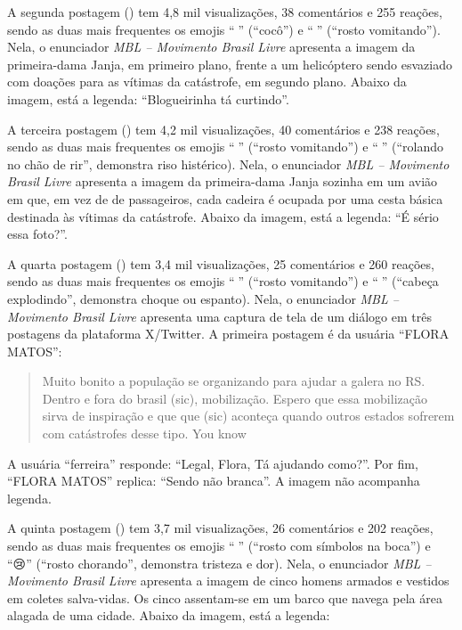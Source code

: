 \documentclass[portuguese]{textolivre}
\begin{document}
A segunda postagem () tem 4,8 mil visualizações, 38 comentários e 255 reações, sendo as duas mais frequentes os emojis ``{\Symbola 💩}'' (``cocô'') e ``{\Symbola 🤮}'' (``rosto vomitando''). Nela, o enunciador \emph{MBL -- Movimento Brasil Livre} apresenta a imagem da primeira-dama Janja, em primeiro plano, frente a um helicóptero sendo esvaziado com doações para as vítimas da catástrofe, em segundo plano. Abaixo da imagem, está a legenda: ``Blogueirinha tá curtindo''.

A terceira postagem () tem 4,2 mil visualizações, 40 comentários e 238 reações, sendo as duas mais frequentes os emojis ``{\Symbola 🤮}'' (``rosto vomitando'') e ``{\Symbola 🤣}'' (``rolando no chão de rir'', demonstra riso histérico). Nela, o enunciador \emph{MBL -- Movimento Brasil Livre} apresenta a imagem da primeira-dama Janja sozinha em um avião em que, em vez de de passageiros, cada cadeira é ocupada por uma cesta básica destinada às vítimas da catástrofe. Abaixo da imagem, está a legenda: ``É sério essa foto?''.

A quarta postagem () tem 3,4 mil visualizações, 25 comentários e 260 reações, sendo as duas mais frequentes os emojis ``{\Symbola 🤮}'' (``rosto vomitando'') e ``{\Symbola 🤯}'' (``cabeça explodindo'', demonstra choque ou espanto). Nela, o enunciador \emph{MBL -- Movimento Brasil Livre} apresenta uma captura de tela de um diálogo em três postagens da plataforma X/Twitter. A primeira postagem é da usuária ``FLORA MATOS'':

\begin{quote}
    Muito bonito a população se organizando para ajudar a galera no RS. Dentro e fora do brasil (sic), mobilização. Espero que essa mobilização sirva de inspiração e que que (sic) aconteça quando outros estados sofrerem com catástrofes desse tipo. You know
\end{quote}
A usuária ``ferreira'' responde: ``Legal, Flora, Tá ajudando como?''. Por fim, ``FLORA MATOS'' replica: ``Sendo não branca''. A imagem não acompanha legenda.

A quinta postagem () tem 3,7 mil visualizações, 26 comentários e 202 reações, sendo as duas mais frequentes os emojis ``{\Symbola 🤬}'' (``rosto com símbolos na boca'') e ``{\Symbola 😢}'' (``rosto chorando'', demonstra tristeza e dor). Nela, o enunciador \emph{MBL -- Movimento Brasil Livre} apresenta a imagem de cinco homens armados e vestidos em coletes salva-vidas. Os cinco assentam-se em um barco que navega pela área alagada de uma cidade. Abaixo da imagem, está a legenda:
\end{document}

